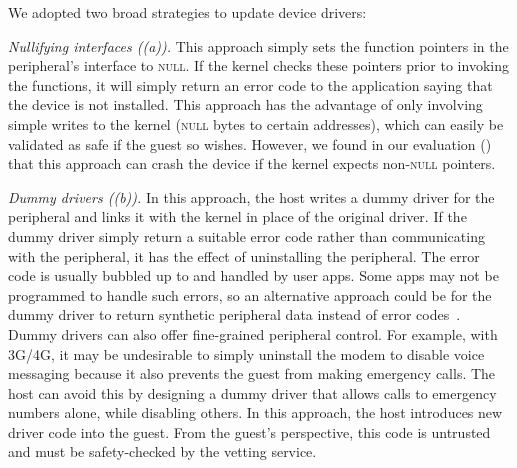 We adopted two broad strategies to update device drivers:  

\begin{mylist} 
%
\item \textit{Nullifying interfaces ((a)).} This
approach simply sets the function pointers in the peripheral's interface to
\textsc{null}. If the kernel checks these pointers prior to invoking the
functions, it will simply return an error code to the application saying that
the device is not installed. This approach has the advantage of only involving
simple writes to the kernel (\textsc{null} bytes to certain addresses), which
can easily be validated as safe if the guest so wishes. However, we found in
our evaluation () that this approach can crash the
device if the kernel expects non-\textsc{null} pointers.
%
\item \textit{Dummy drivers ((b)).} In this approach,
the host writes a dummy driver for the peripheral and links it with the kernel
in place of the original driver. If the dummy driver simply return a suitable
error code rather than communicating with the peripheral, it has the effect of
uninstalling the peripheral. The error code is usually bubbled up to and
handled by user apps. Some apps may not be programmed to handle such errors, so
an alternative approach could be for the dummy driver to return synthetic
peripheral data instead of error codes~\cite{mockdroid:hotmobile10}. Dummy
drivers can also offer fine-grained peripheral control. For example, with
3G/4G, it may be undesirable to simply uninstall the modem to disable voice
messaging because it also prevents the guest from making emergency calls. The
host can avoid this by designing a dummy driver that allows calls to emergency
numbers alone, while disabling others. In this approach, the host introduces
new driver code into the guest. From the guest's perspective, this code is
untrusted and must be safety-checked by the vetting service.

\end{mylist}

